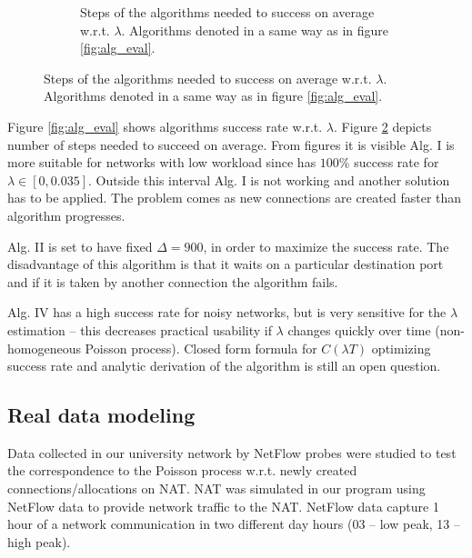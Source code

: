 \documentclass{llncs}
\begin{document}
\begin{figure}
{\begin{subfigure}{0.5\textwidth}
	\caption{Steps of the algorithms needed to success on average w.r.t. $\lambda$. 
	Algorithms denoted in a same way as in figure \ref{fig:alg_eval}.}
	\label{fig:alg_steps}
     \end{subfigure}}%
    \vspace{-30pt}
\end{figure}


Figure \ref{fig:alg_eval} shows algorithms success rate w.r.t. $\lambda$. 
Figure \ref{fig:alg_steps} depicts number of steps needed 
to succeed on average. From figures it is visible Alg. I is more suitable for networks with low 
workload since has $100\%$ success rate for $\lambda \in [0, 0.035]$. Outside this interval 
Alg. I is not working and another solution has to be applied. The problem comes as new connections are
created faster than algorithm progresses.

Alg. II is set to have fixed $\Delta=900$, in order to maximize the success rate. The disadvantage of this
algorithm is that it waits on a particular destination port and if it is taken by another connection
the algorithm fails. 

Alg. IV has a high success rate for 
noisy networks, but is very sensitive for the $\lambda$ estimation -- this decreases practical usability 
if $\lambda$ changes quickly over time (non-homogeneous Poisson process). Closed form formula for $C(\lambda T)$ 
optimizing success rate and analytic derivation of the algorithm is still an open question. 


\subsection{Real data modeling}
Data collected in our university network by NetFlow probes were studied to test the correspondence to the Poisson process
w.r.t. newly created connections/allocations on NAT. NAT was simulated in our program using
NetFlow data to provide network traffic to the NAT. NetFlow data capture 1 hour of a network communication in two different
day hours (03 -- low peak, 13 -- high peak).
\end{document}
